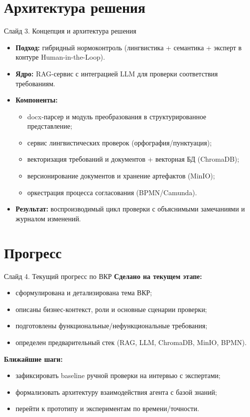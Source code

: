 \documentclass[aspectratio=169,12pt]{beamer}
\begin{document}
\section{Архитектура решения}
\begin{frame}{Слайд 3. Концепция и архитектура решения}
\begin{itemize}
  \item \textbf{Подход:} гибридный нормоконтроль (лингвистика + семантика + эксперт в контуре Human-in-the-Loop).
  \item \textbf{Ядро:} RAG-сервис с интеграцией LLM для проверки соответствия требованиям.
  \item \textbf{Компоненты:}
  \begin{itemize}
    \item docx-парсер и модуль преобразования в структурированное представление;
    \item сервис лингвистических проверок (орфография/пунктуация);
    \item векторизация требований и документов + векторная БД (ChromaDB);
    \item версионирование документов и хранение артефактов (MinIO);
    \item оркестрация процесса согласования (BPMN/Camunda).
  \end{itemize}
  \item \textbf{Результат:} воспроизводимый цикл проверки с объяснимыми замечаниями и журналом изменений.
\end{itemize}
\end{frame}

\section{Прогресс}
\begin{frame}{Слайд 4. Текущий прогресс по ВКР}
\textbf{Сделано на текущем этапе:}
\begin{itemize}
  \item сформулирована и детализирована тема ВКР;
  \item описаны бизнес-контекст, роли и основные сценарии проверки;
  \item подготовлены функциональные/нефункциональные требования;
  \item определен предварительный стек (RAG, LLM, ChromaDB, MinIO, BPMN).
\end{itemize}

\vspace{0.2em}
\textbf{Ближайшие шаги:}
\begin{itemize}
  \item зафиксировать baseline ручной проверки на интервью с экспертами;
  \item формализовать архитектуру взаимодействия агента с базой знаний;
  \item перейти к прототипу и экспериментам по времени/точности.
\end{itemize}
\end{frame}
\end{document}
